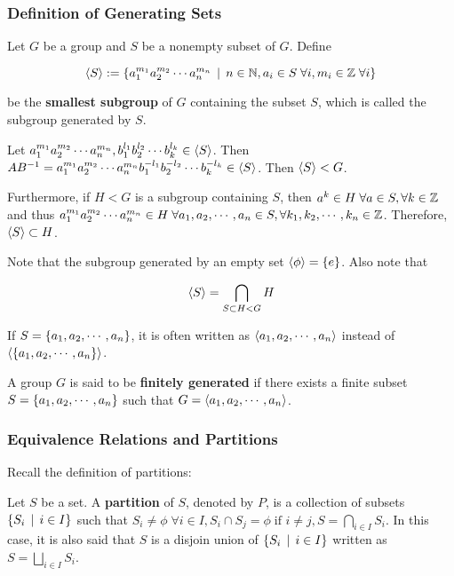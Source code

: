 \documentclass[a4paper,12pt]{article}
\begin{document}
\subsubsection{Definition of Generating Sets}
\begin{dft}
  Let $G$ be a group and $S$ be a nonempty subset of $G$. Define

  $$\left\langle S\right\rangle:=\left\{ a_{1}^{m_{1}}a_{2}^{m_{2}}\cdots a_{n}^{m_{n}}\,\mid\, n\in\mathbb{N},a_{i}\in S\;\forall i,m_{i}\in\mathbb{Z}\;\forall i\right\}$$\s

  be the \textbf{smallest subgroup} of $G$ containing the subset $S$, which is called the subgroup generated by $S$.\n

  \prf[zg] Let $a_{1}^{m_{1}}a_{2}^{m_{2}}\cdots a_{n}^{m_{n}},b_{1}^{l_{1}}b_{2}^{l_{2}}\cdots b_{k}^{l_{k}}\in\left\langle S\right\rangle$. Then $AB^{-1}=a_{1}^{m_{1}}a_{2}^{m_{2}}\cdots a_{n}^{m_{n}}b_{1}^{-l_{1}}b_{2}^{-l_{2}}\cdots b_{k}^{-l_{k}}\in\left\langle S\right\rangle$. Then $\left\langle S\right\rangle<G$.\n

  Furthermore, if $H<G$ is a subgroup containing $S$, then $a^{k}\in H\;\forall a\in S,\forall k\in\mathbb{Z}$ and thus $a_{1}^{m_{1}}a_{2}^{m_{2}}\cdots a_{n}^{m_{n}}\in H\;\forall a_{1},a_{2},\cdots,a_{n}\in S,\forall k_{1},k_{2},\cdots,k_{n}\in\mathbb{Z}$. Therefore, $\left\langle S\right\rangle\subset H$.
\end{dft}\n

Note that the subgroup generated by an empty set $\left\langle \phi\right\rangle=\left\{ e\right\}$. Also note that

$$\left\langle S\right\rangle=\bigcap_{S\subset H<G}H$$\s

If $S=\left\{ a_{1},a_{2},\cdots,a_{n}\right\}$, it is often written as $\left\langle a_{1},a_{2},\cdots,a_{n}\right\rangle$ instead of $\left\langle \left\{ a_{1},a_{2},\cdots,a_{n}\right\}\right\rangle$.\n

\begin{dft}
  A group $G$ is said to be \textbf{finitely generated} if there exists a finite subset $S=\left\{ a_{1},a_{2},\cdots,a_{n}\right\}$ such that $G=\left\langle a_{1},a_{2},\cdots,a_{n}\right\rangle$.
\end{dft}

\subsubsection{Equivalence Relations and Partitions}
Recall the definition of partitions:\n

\begin{dft}
  Let $S$ be a set. A \textbf{partition} of $S$, denoted by $P$, is a collection of subsets $\left\{ S_{i}\,\mid\, i\in I\right\}$ such that $S_{i}\neq\phi\;\forall i\in I, S_{i}\cap S_{j}=\phi\;\text{if }i\neq j,S=\bigcap_{i\in I}S_{i}$. In this case, it is also said that $S$ is a disjoin union of $\left\{ S_{i}\,\mid\, i\in I\right\}$ written as $S=\bigsqcup_{i\in I}S_{i}$.
\end{dft}\n
\end{document}
